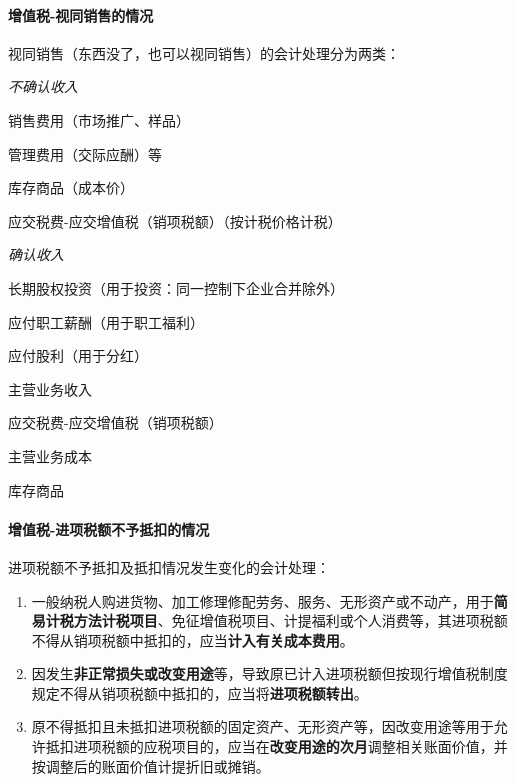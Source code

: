 \documentclass[UTF8,12pt]{ctexart}
\newenvironment{Dr}{%
	\begin{list}{}%
		{
			\setlength{\leftmargin}{2em}
			\setlength{\labelwidth}{2em}
			\setlength{\labelsep}{0pt}
			\setlength{\itemindent}{0pt}
			\setlength{\listparindent}{0pt}
			\setlength{\parsep}{0pt}
			\setlength{\topsep}{0pt}
		}
		\item[\textbf{借：}]
	}{%
	\end{list}
}
\newenvironment{Cr}{%
	\begin{list}{}%
		{
			\setlength{\leftmargin}{3em}
			\setlength{\labelwidth}{2em}
			\setlength{\labelsep}{0pt}
			\setlength{\itemindent}{0pt}
			\setlength{\listparindent}{0pt}
			\setlength{\parsep}{0pt}
			\setlength{\topsep}{0pt}
		}
		\item[\textbf{贷：}]
	}{%
	\end{list}
}
\numberwithin{equation}{section} %
\numberwithin{figure}{section}
\numberwithin{table}{section}
\begin{document}
	\paragraph{增值税-视同销售的情况}视同销售（东西没了，也可以视同销售）的会计处理分为两类：
	
	\textit{不确认收入}
	
	\begin{Dr}
		销售费用（市场推广、样品）
		
		管理费用（交际应酬）等
	\end{Dr}
	\begin{Cr}
		库存商品（成本价）
		
		应交税费-应交增值税（销项税额）（按计税价格计税）
	\end{Cr}

	
	\textit{确认收入}
	
	\begin{Dr}
		长期股权投资（用于投资：同一控制下企业合并除外）
		
		应付职工薪酬（用于职工福利）
		
		应付股利（用于分红）
	\end{Dr}
	\begin{Cr}
		主营业务收入
		
		应交税费-应交增值税（销项税额）
	\end{Cr}
	
	\begin{Dr}
		主营业务成本
	\end{Dr}
	\begin{Cr}
		库存商品
	\end{Cr}

	
	\paragraph{增值税-进项税额不予抵扣的情况}进项税额不予抵扣及抵扣情况发生变化的会计处理：
	\begin{enumerate}
		\item 一般纳税人购进货物、加工修理修配劳务、服务、无形资产或不动产，用于\textbf{简易计税方法计税项目}、免征增值税项目、计提福利或个人消费等，其进项税额不得从销项税额中抵扣的，应当\textbf{计入有关成本费用}。
		
		\item 因发生\textbf{非正常损失或改变用途}等，导致原已计入进项税额但按现行增值税制度规定不得从销项税额中抵扣的，应当将\textbf{进项税额转出}。
		
		\item 原不得抵扣且未抵扣进项税额的固定资产、无形资产等，因改变用途等用于允许抵扣进项税额的应税项目的，应当在\textbf{改变用途的次月}调整相关账面价值，并按调整后的账面价值计提折旧或摊销。
	\end{enumerate}
\end{document}
